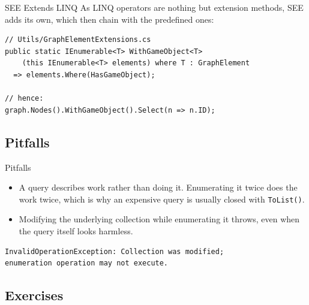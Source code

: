 \begin{frame}[fragile]{SEE Extends LINQ}
  As LINQ operators are nothing but extension methods, SEE adds its own, which
  then chain with the predefined ones:
  \vspace{1ex}

  \begin{lstlisting}[basicstyle=\scriptsize\ttfamily]
// Utils/GraphElementExtensions.cs
public static IEnumerable<T> WithGameObject<T>
    (this IEnumerable<T> elements) where T : GraphElement
  => elements.Where(HasGameObject);

// hence:
graph.Nodes().WithGameObject().Select(n => n.ID);
  \end{lstlisting}
  \vspace{4ex}

\end{frame}

\subsection{Pitfalls}

\begin{frame}[fragile]{Pitfalls}
  \begin{itemize}
    \item A query describes work rather than doing it. Enumerating it twice
      does the work twice, which is why an expensive query is usually closed
      with \texttt{ToList()}.
    \item Modifying the underlying collection while enumerating it throws,
      even when the query itself looks harmless.
  \end{itemize}
  \vspace{1ex}

  \begin{lstlisting}[language={},basicstyle=\scriptsize\ttfamily]
InvalidOperationException: Collection was modified;
enumeration operation may not execute.
  \end{lstlisting}
  \vspace{4ex}

\end{frame}

\subsection{Exercises}

